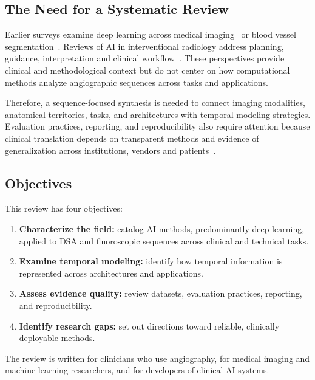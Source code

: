 
\subsection{The Need for a Systematic Review}
Earlier surveys examine deep learning across medical imaging~\cite{Litjens2017,Shen2017} or blood vessel segmentation~\cite{Moccia2018}. Reviews of AI in interventional radiology address planning, guidance, interpretation and clinical workflow~\cite{Iezzi2019,Gurgitano2021,Mukhtar2025}. These perspectives provide clinical and methodological context but do not center on how computational methods analyze angiographic sequences across tasks and applications.

Therefore, a sequence-focused synthesis is needed to connect imaging modalities, anatomical territories, tasks, and architectures with temporal modeling strategies. Evaluation practices, reporting, and reproducibility also require attention because clinical translation depends on transparent methods and evidence of generalization across institutions, vendors and patients~\cite{Tejani2024,collins2024tripod+}.



\subsection{Objectives}
\label{sec:intro-objectives}

This review has four objectives:

\begin{enumerate}[label=\textbf{O\arabic*.}, leftmargin=*, itemsep=4pt]
\item \textbf{Characterize the field:} catalog AI methods, predominantly deep learning, applied to DSA and fluoroscopic sequences across clinical and technical tasks.
\item \textbf{Examine temporal modeling:} identify how temporal information is represented across architectures and applications.
\item \textbf{Assess evidence quality:} review datasets, evaluation practices, reporting, and reproducibility.
\item \textbf{Identify research gaps:} set out directions toward reliable, clinically deployable methods.
\end{enumerate}

The review is written for clinicians who use angiography, for medical imaging and machine learning researchers, and for developers of clinical AI systems.

